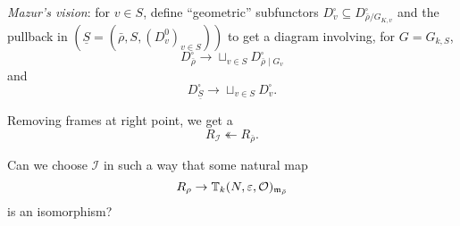 \documentclass[reqno]{amsart} 
\numberwithin{theorem}{section}
\numberwithin{equation}{section}
\numberwithin{exercise}{section}
\begin{document}
\emph{Mazur's vision}: for $v \in S$, define ``geometric'' subfunctors $D_v^{\square} \subseteq D_{\bar{\rho} / G_{K, v}}^{\square}$ and the pullback in $(\underline{S} =(\bar{\rho}, S,(D_v^0)_{v \in S}))$ to get a diagram involving, for $G = G_{k , S}$,
\begin{equation*}
  D_{\bar{\rho}}^{\square} \rightarrow \sqcup_{v \in S} D_{\bar{\rho} \mid G_v}^{\square}
\end{equation*}
and
\begin{equation*}
  D_{\underline{S}}^{\square} \rightarrow \sqcup_{v \in S} D_v^{\square}.
\end{equation*}

Removing frames at right point, we get a
\begin{equation*}
  R_{\mathcal{I}} \twoheadleftarrow R_{\bar{\rho}}.
\end{equation*}

\begin{question}\label{question:cq6thpc16r}
  Can we choose $\mathcal{I}$ in such a way that some natural map
  \begin{equation*}
    R_{\rho} \rightarrow \mathbb{T}_k(N, \varepsilon, \mathcal{O})_{\mathfrak{m}_{\bar{\rho}}}
  \end{equation*}
  is an isomorphism?
\end{question}
\end{document}
